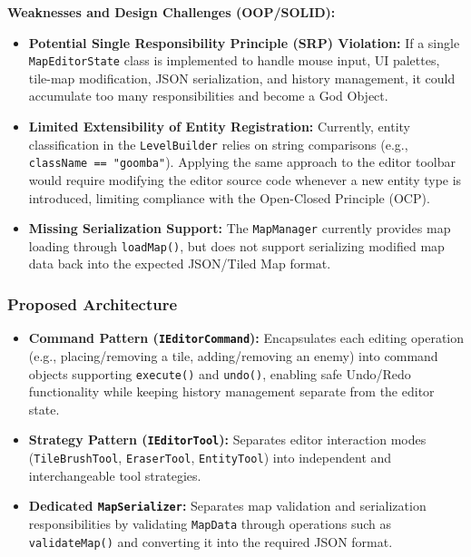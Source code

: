 \vspace{0.3cm}
\noindent\textbf{Weaknesses and Design Challenges (OOP/SOLID):}
\begin{itemize}
    \item \textbf{Potential Single Responsibility Principle (SRP) Violation:} If a single \texttt{MapEditorState} class is implemented to handle mouse input, UI palettes, tile-map modification, JSON serialization, and history management, it could accumulate too many responsibilities and become a God Object.
    
    \item \textbf{Limited Extensibility of Entity Registration:} Currently, entity classification in the \texttt{LevelBuilder} relies on string comparisons (e.g., \texttt{className == "goomba"}). Applying the same approach to the editor toolbar would require modifying the editor source code whenever a new entity type is introduced, limiting compliance with the Open-Closed Principle (OCP).
    
    \item \textbf{Missing Serialization Support:} The \texttt{MapManager} currently provides map loading through \texttt{loadMap()}, but does not support serializing modified map data back into the expected JSON/Tiled Map format.
\end{itemize}

\subsubsection{Proposed Architecture}
\begin{itemize}
    \item \textbf{Command Pattern (\texttt{IEditorCommand}):} Encapsulates each editing operation (e.g., placing/removing a tile, adding/removing an enemy) into command objects supporting \texttt{execute()} and \texttt{undo()}, enabling safe Undo/Redo functionality while keeping history management separate from the editor state.
    
    \item \textbf{Strategy Pattern (\texttt{IEditorTool}):} Separates editor interaction modes (\texttt{TileBrushTool}, \texttt{EraserTool}, \texttt{EntityTool}) into independent and interchangeable tool strategies.
    
    \item \textbf{Dedicated \texttt{MapSerializer}:} Separates map validation and serialization responsibilities by validating \texttt{MapData} through operations such as \texttt{validateMap()} and converting it into the required JSON format.
\end{itemize}

